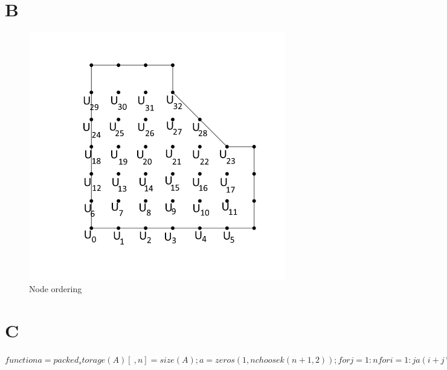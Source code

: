 \documentclass[12pt,a4paper]{article}
\begin{document}
\section*{B}
\begin{figure}[h!]
	\includegraphics[width=\linewidth]{images/ComponentNodesOrdering.png}
	\caption{Node ordering}
	\label{fig:componentNodes}
\end{figure}

\section*{C}
\begin{center}
$function a=packed_storage(A)
[~,n]=size(A);
a=zeros(1,nchoosek(n+1,2));
for j=1:n
    for i=1:j
       a(i+j*(j-1)/2) = A(i,j);
    end
end$
\end{center}
\end{document}
